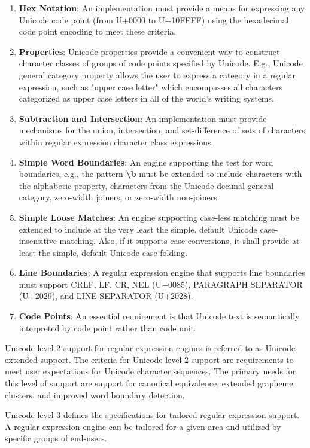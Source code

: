 \begin{enumerate}
    \item \textbf{Hex Notation}: An implementation must provide a means for expressing any Unicode code point (from U+0000 to U+10FFFF) using the hexadecimal code point encoding to meet these criteria.
    \item \textbf{Properties}: Unicode properties provide a convenient way to construct character classes of groups of code points specified by Unicode. E.g., Unicode general category property allows the user to express a category in a regular expression, such as "upper case letter" which encompasses all characters categorized as upper case letters in all of the world's writing systems.
    \item \textbf{Subtraction and Intersection}: An implementation must provide mechanisms for the union, intersection, and set-difference of sets of characters within regular expression character class expressions.
    \item \textbf{Simple Word Boundaries}: An engine supporting the test for word boundaries, e.g., the pattern \textbf{\textbackslash b} must be extended to include characters with the alphabetic property, characters from the Unicode decimal general category, zero-width joiners, or zero-width non-joiners.
    \item \textbf{Simple Loose Matches}: An engine supporting case-less matching must be extended to include at the very least the simple, default Unicode case-insensitive matching. Also, if it supports case conversions, it shall provide at least the simple, default Unicode case folding.
    \item \textbf{Line Boundaries}: A regular expression engine that supports line boundaries must support CRLF, LF, CR, NEL (U+0085), PARAGRAPH SEPARATOR (U+2029), and LINE SEPARATOR (U+2028).
    \item \textbf{Code Points}: An essential requirement is that Unicode text is semantically interpreted by code point rather than code unit.
\end{enumerate}

Unicode level 2 support for regular expression engines is referred to as Unicode extended support. The criteria for Unicode level 2 support are requirements to meet user expectations for Unicode character sequences. The primary needs for this level of support are support for canonical equivalence, extended grapheme clusters, and improved word boundary detection.

Unicode level 3 defines the specifications for tailored regular expression support. A regular expression engine can be tailored for a given area and utilized by specific groups of end-users.

